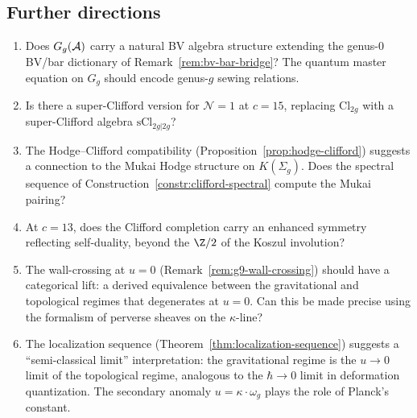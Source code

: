 %
%

\subsection{Further directions}
\label{subsec:further-directions}

\begin{remark}
\label{rem:g9-open-questions}
\begin{enumerate}[label=\textup{(\alph*)}]
\item Does $G_g(\mathcal{A})$ carry a natural BV algebra structure
extending the genus-$0$ BV/bar dictionary of
Remark~\ref{rem:bv-bar-bridge}? The quantum master
equation on $G_g$ should encode genus-$g$ sewing relations.

\item Is there a super-Clifford version for $\mathcal{N} = 1$ at
$c = 15$, replacing $\mathrm{Cl}_{2g}$ with a super-Clifford algebra
$\mathrm{sCl}_{2g|2g}$?

\item The Hodge--Clifford compatibility
(Proposition~\ref{prop:hodge-clifford}) suggests a connection to the
Mukai Hodge structure on $K(\Sigma_g)$. Does the spectral sequence of
Construction~\ref{constr:clifford-spectral} compute the Mukai pairing?

\item At $c = 13$, does the Clifford completion carry an enhanced
symmetry reflecting self-duality, beyond the $\Z/2$ of the Koszul
involution?

\item The wall-crossing at $u = 0$
(Remark~\ref{rem:g9-wall-crossing}) should have a categorical lift:
a derived equivalence between the gravitational and topological
regimes that degenerates at $u = 0$. Can this be made precise using
the formalism of perverse sheaves on the $\kappa$-line?

\item The localization sequence
(Theorem~\ref{thm:localization-sequence}) suggests a
``semi-classical limit'' interpretation: the gravitational regime is
the $u \to 0$ limit of the topological regime, analogous to the
$\hbar \to 0$ limit in deformation quantization. The secondary
anomaly $u = \kappa \cdot \omega_g$ plays the role of Planck's
constant.
\end{enumerate}
\end{remark}
